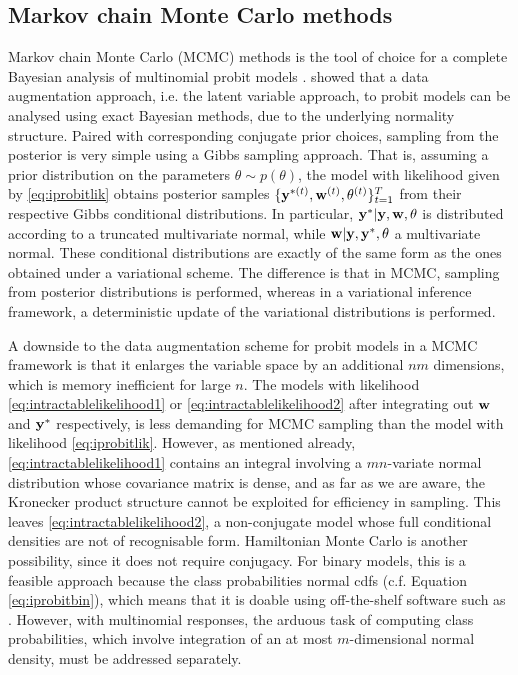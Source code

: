 \subsection{Markov chain Monte Carlo methods}

Markov chain Monte Carlo (MCMC) methods is the tool of choice for a complete Bayesian analysis of multinomial probit models \citep{mcculloch2000bayesian,nobile1998hybrid,mcculloch2000bayesian}.
\citet{albert1993bayesian} showed that a data augmentation approach, i.e. the latent variable approach, to probit models can be analysed using exact Bayesian methods, due to the underlying normality structure.
Paired with corresponding conjugate prior choices, sampling from the posterior is very simple using a Gibbs sampling approach.
That is, assuming a prior distribution on the parameters $\theta\sim p(\theta)$, the model with likelihood given by \cref{eq:iprobitlik} obtains posterior samples $\{{\mathbf y}^{*(t)}, {\mathbf w}^{(t)},\theta^{(t)} \}_{t=1}^T$ from their respective Gibbs conditional distributions.
In particular, ${\mathbf y}^{*}|{\mathbf y},{\mathbf w},\theta$ is distributed according to a truncated multivariate normal, while ${\mathbf w}|{\mathbf y},{\mathbf y}^*,\theta$ a multivariate normal.
These conditional distributions are exactly of the same form as the ones obtained under a variational scheme.
The difference is that in MCMC, sampling from posterior distributions is performed, whereas in a variational inference framework, a deterministic update of the variational distributions is performed.

A downside to the data augmentation scheme for probit models in a MCMC framework is that it enlarges the variable space by an additional $nm$ dimensions, which is memory inefficient for large $n$.
The models with likelihood \cref{eq:intractablelikelihood1} or \cref{eq:intractablelikelihood2} after integrating out ${\mathbf w}$ and ${\mathbf y}^*$ respectively, is less demanding for MCMC sampling than the model with likelihood \cref{eq:iprobitlik}.
However, as mentioned already, \cref{eq:intractablelikelihood1} contains an integral involving a $mn$-variate normal distribution whose covariance matrix is dense, and as far as we are aware, the Kronecker product structure cannot be exploited for efficiency in sampling.
This leaves \cref{eq:intractablelikelihood2}, a non-conjugate model whose full conditional densities are not of recognisable form.
Hamiltonian Monte Carlo is another possibility, since it does not require conjugacy.
For binary models, this is a feasible approach because the class probabilities normal cdfs (c.f. {\color{\mycitecolour}Equation} \ref{eq:iprobitbin}), which means that it is doable using off-the-shelf software such as .
However, with multinomial responses, the arduous task of computing class probabilities, which involve integration of an at most $m$-dimensional normal density, must be addressed separately.

